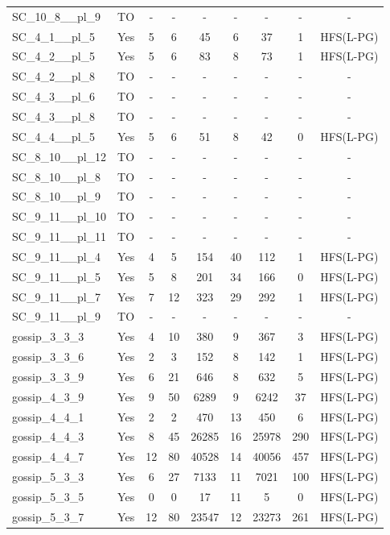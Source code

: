 \documentclass{article}
\begin{document}
\begin{tabular}{lcccccccc}
SC\_10\_8\_\_pl\_9 & TO & - & - & - & - & - & - & - \\
SC\_4\_1\_\_pl\_5 & Yes & 5 & 6 & 45 & 6 & 37 & 1 & HFS(L-PG) \\
SC\_4\_2\_\_pl\_5 & Yes & 5 & 6 & 83 & 8 & 73 & 1 & HFS(L-PG) \\
SC\_4\_2\_\_pl\_8 & TO & - & - & - & - & - & - & - \\
SC\_4\_3\_\_pl\_6 & TO & - & - & - & - & - & - & - \\
SC\_4\_3\_\_pl\_8 & TO & - & - & - & - & - & - & - \\
SC\_4\_4\_\_pl\_5 & Yes & 5 & 6 & 51 & 8 & 42 & 0 & HFS(L-PG) \\
SC\_8\_10\_\_pl\_12 & TO & - & - & - & - & - & - & - \\
SC\_8\_10\_\_pl\_8 & TO & - & - & - & - & - & - & - \\
SC\_8\_10\_\_pl\_9 & TO & - & - & - & - & - & - & - \\
SC\_9\_11\_\_pl\_10 & TO & - & - & - & - & - & - & - \\
SC\_9\_11\_\_pl\_11 & TO & - & - & - & - & - & - & - \\
SC\_9\_11\_\_pl\_4 & Yes & 4 & 5 & 154 & 40 & 112 & 1 & HFS(L-PG) \\
SC\_9\_11\_\_pl\_5 & Yes & 5 & 8 & 201 & 34 & 166 & 0 & HFS(L-PG) \\
SC\_9\_11\_\_pl\_7 & Yes & 7 & 12 & 323 & 29 & 292 & 1 & HFS(L-PG) \\
SC\_9\_11\_\_pl\_9 & TO & - & - & - & - & - & - & - \\
gossip\_3\_3\_3 & Yes & 4 & 10 & 380 & 9 & 367 & 3 & HFS(L-PG) \\
gossip\_3\_3\_6 & Yes & 2 & 3 & 152 & 8 & 142 & 1 & HFS(L-PG) \\
gossip\_3\_3\_9 & Yes & 6 & 21 & 646 & 8 & 632 & 5 & HFS(L-PG) \\
gossip\_4\_3\_9 & Yes & 9 & 50 & 6289 & 9 & 6242 & 37 & HFS(L-PG) \\
gossip\_4\_4\_1 & Yes & 2 & 2 & 470 & 13 & 450 & 6 & HFS(L-PG) \\
gossip\_4\_4\_3 & Yes & 8 & 45 & 26285 & 16 & 25978 & 290 & HFS(L-PG) \\
gossip\_4\_4\_7 & Yes & 12 & 80 & 40528 & 14 & 40056 & 457 & HFS(L-PG) \\
gossip\_5\_3\_3 & Yes & 6 & 27 & 7133 & 11 & 7021 & 100 & HFS(L-PG) \\
gossip\_5\_3\_5 & Yes & 0 & 0 & 17 & 11 & 5 & 0 & HFS(L-PG) \\
gossip\_5\_3\_7 & Yes & 12 & 80 & 23547 & 12 & 23273 & 261 & HFS(L-PG) \\

\end{tabular}
\end{document}
